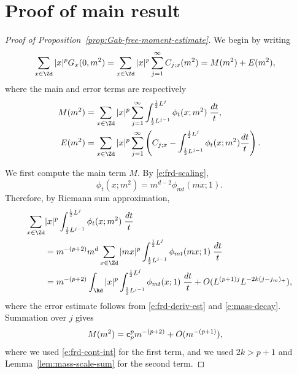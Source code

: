 
\section{Proof of main result}

\begin{proof}[Proof of Proposition~\ref{prop:Gab-free-moment-estimate}]

We begin by writing
\begin{align}
\sum_{x\in\Zd} |x|^p G_x(0, m^2)
    &=
    \sum_{x\in\Zd} |x|^p
    \sum_{j=1}^\infty C_{j;x}(m^2)
    =
M(m^2)
+
E(m^2)
,
\end{align}
where the main and error terms are respectively
\begin{align}
M(m^2) &=
\sum_{x\in\Zd} |x|^p \sum_{j=1}^\infty
\int_{\frac 12 L^{j-1}}^{\frac 12 L^j} \phi_t(x; m^2) \;\frac{dt}{t},
\\
E(m^2) &= \sum_{x\in\Zd} |x|^p \sum_{j=1}^\infty \left(C_{j;x} - \int_{\frac{1}{2} L^{j-1}}^{\frac{1}{2} L^j} \phi_t(x; m^2) \frac{dt}{t}\right).
\end{align}

We first compute the main term $M$. By \eqref{e:frd-scaling},
\begin{equation}
\phi_t(x; m^2) = m^{d-2} \phi_{mt}(mx; 1).
\end{equation}
Therefore, by Riemann sum approximation,
\begin{align}
\sum_{x\in\Zd} &|x|^p \int_{\frac{1}{2} L^{j-1}}^{\frac{1}{2} L^j} \phi_t(x; m^2) \; \frac{dt}{t} \\
  &= m^{-(p+2)} m^d \sum_{x\in\Zd} |mx|^p \int_{\frac{1}{2} L^{j-1}}^{\frac{1}{2} L^j} \phi_{mt}(mx; 1) \; \frac{dt}{t}
  \\ \nonumber
  &= m^{-(p + 2)} \int_\Rd |x|^p \int_{\frac{1}{2} L^{j-1}}^{\frac{1}{2} L^j} \phi_{mt}(x; 1) \; \frac{dt}{t}
    + O(L^{(p + 1) j}
    L^{-2k(j-j_m)_+})
    ,
\end{align}
where the error estimate follows from \eqref{e:frd-deriv-est} and \eqref{e:mass-decay}.
Summation over $j$ gives
\begin{align}
M(m^2)
&= {\sf c}_p^p m^{-(p + 2)} + O(m^{-(p + 1)}),
\end{align}
where we used
\eqref{e:frd-cont-int} for the first term, and we used $2k>p+1$ and
Lemma~\ref{lem:mass-scale-sum} for the second term.


\end{proof}
